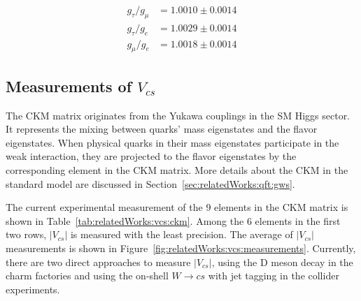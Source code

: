 \begin{align*}
    g_\tau / g_\mu &= 1.0010 \pm 0.0014 \\
    g_\tau / g_e   &= 1.0029 \pm 0.0014 \\
    g_\mu  / g_e   &= 1.0018 \pm 0.0014 
\end{align*}





\subsection{Measurements of $V_{cs}$ }
\label{sec:relatedWorks:vcsMeasurements}

The CKM matrix originates from the Yukawa couplings in the SM Higgs sector. It represents the mixing between quarks' mass eigenstates and the flavor eigenstates. When physical quarks in their mass eigenstates participate in the weak interaction, they are projected to the flavor eigenstates by the corresponding element in the CKM matrix. More details about the CKM in the standard model are discussed in Section~\ref{sec:relatedWorks:qft:gws}. 

\begin{table}[ht]
    \centering
    \setlength{\tabcolsep}{1.5em}
    \renewcommand{\arraystretch}{1.5}
    \caption{The current experimental world average of the 9 elements in the CKM matrix in the PDG \cite{pdg2020}.  }
    \label{tab:relatedWorks:vcs:ckm}
\end{table}


The current experimental measurement of the 9 elements in the CKM matrix \cite{pdg2020} is shown in Table~\ref{tab:relatedWorks:vcs:ckm}. Among the 6 elements in the first two rows, $|V_{cs}|$ is measured with the least precision. The average of $|V_{cs}|$ measurements is shown in Figure~\ref{fig:relatedWorks:vcs:measurements}. Currently, there are two direct approaches to measure $|V_{cs}|$, using the D meson decay in the charm factories and using the on-shell $W\to c s$  with jet tagging in the collider experiments.

